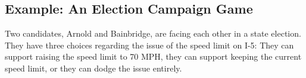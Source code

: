 

\subsection{Example: An Election Campaign Game}\label{Ex:election}




Two candidates, Arnold and Bainbridge, are facing each other in a state election. They have three choices regarding the issue of the speed limit on I-5: They can support raising the speed limit to 70 MPH, they can support keeping the current speed limit, or they can dodge the issue entirely. 

